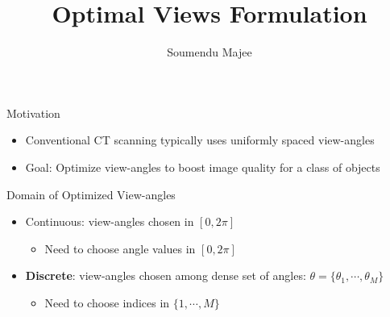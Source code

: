 \documentclass[english,aspectratio=169]{beamer}
\title{Optimal Views Formulation}
\author{Soumendu Majee}
\date{}
\begin{document}
\begin{frame}
    \titlepage
\end{frame}


\begin{frame}{Motivation}
	\begin{itemize}
	    \setlength\itemsep{2em}
		\item Conventional CT scanning typically uses uniformly spaced view-angles
		
		\item Goal: Optimize view-angles to boost image quality for a class of objects
		
		
	\end{itemize}
\end{frame}

\begin{frame}{Domain of Optimized View-angles}
	\begin{itemize}
	    \setlength\itemsep{2em}
		\item Continuous: view-angles chosen in $[0, 2\pi]$
		\begin{itemize}
		    \item Need to choose angle values in $[0, 2\pi]$
	    \end{itemize}
		
		\item \textbf{Discrete}: view-angles chosen among dense set of angles: $\theta = \{\theta_1, \cdots, \theta_M \}$
		\begin{itemize}
		    \item Need to choose indices in $\{ 1, \cdots, M \}$
		
	    \end{itemize}
		
		
	\end{itemize}
\end{frame}
\end{document}
